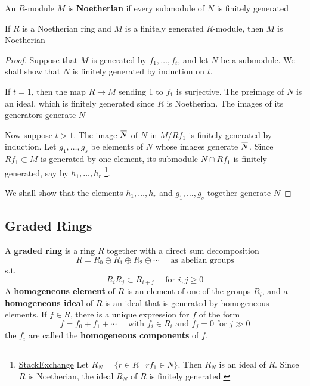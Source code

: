 \documentclass[11pt]{article}
\begin{document}
An \(R\)-module \(M\) is \textbf{Noetherian} if every submodule of \(N\) is finitely
generated

\begin{proposition}[]
\label{prop1.4}
If \(R\) is a Noetherian ring and \(M\) is a finitely generated \(R\)-module,
then \(M\) is Noetherian
\end{proposition}

\begin{proof}
Suppose that \(M\) is generated by \(f_1,\dots,f_t\), and let \(N\) be a
submodule. We shall show that \(N\) is finitely generated by induction on
\(t\).

If \(t=1\), then the map \(R\to M\) sending 1 to \(f_1\) is surjective. The
preimage of \(N\) is an ideal, which is finitely generated since \(R\) is
Noetherian. The images of its generators generate \(N\)

Now suppose \(\iffalse<\fi t>1\). The image \(\bbar{N}\) of \(N\) in \(M/Rf_1\) is
finitely generated by induction. Let \(g_1,\dots,g_s\) be elements of \(N\)
whose images generate \(\bbar{N}\). Since \(Rf_1\subset M\)  is generated by
one element, its submodule \(N\cap Rf_1\) is finitely generated, say by
\(h_1,\dots,h_r\) \footnote{\href{https://math.stackexchange.com/questions/561655/that-submodule-generated-by-one-element-leads-to-submodule-being-finitely-genera}{StackExchange} Let \(R_N=\{r\in R\mid rf_1\in N\}\). Then \(R_N\) is an
ideal of \(R\). Since \(R\) is Noetherian, the ideal \(R_N\) of \(R\) is
finitely generated.}.

We shall show that the elements \(h_1,\dots,h_r\) and \(g_1,\dots,g_s\)
together generate \(N\)
\end{proof}
\subsection{Graded Rings}
\label{sec:orgecc5eee}
A \textbf{graded ring} is a ring \(R\) together with a direct sum decomposition
\begin{equation*}
R=R_0\oplus R_1\oplus R_2\oplus\cdots\quad\text{ as abelian groups}
\end{equation*}
s.t.
\begin{equation*}
R_iR_j\subset R_{i+j}\quad\text{ for }i,j\ge0
\end{equation*}
A \textbf{homogeneous element} of \(R\) is an element of one of the groups \(R_i\),
and a \textbf{homogeneous ideal} of \(R\) is an ideal that is generated by homogeneous
elements. If \(f\in R\), there is a unique expression for \(f\) of the form
\begin{equation*}
f=f_0+f_1+\cdots\quad\text{ with } f_i\in R_i\text{ and }f_j=0\text{ for }j\gg0
\end{equation*}
the \(f_i\) are called the \textbf{homogeneous components} of \(f\).
\end{document}
